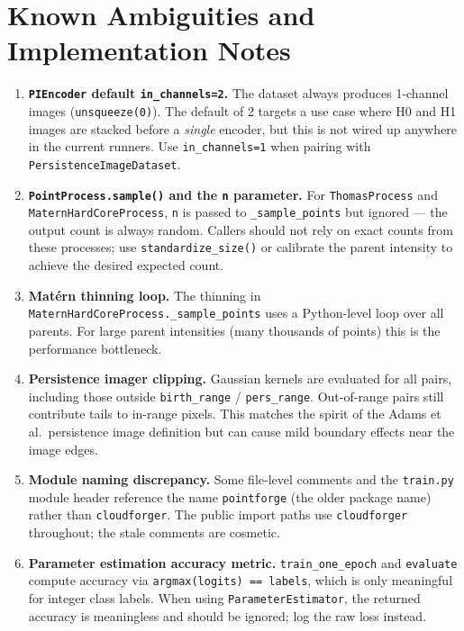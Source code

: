 \documentclass[11pt, a4paper]{article}
\newcommand{\code}[1]{\texttt{#1}}
\begin{document}
\section{Known Ambiguities and Implementation Notes}
\label{sec:ambiguities}

\begin{enumerate}

  \item \textbf{\code{PIEncoder} default \code{in\_channels=2}.}
        The dataset always produces 1-channel images
        (\code{unsqueeze(0)}).
        The default of 2 targets a use case where H0 and H1 images
        are stacked before a \emph{single} encoder, but this is not
        wired up anywhere in the current runners.
        Use \code{in\_channels=1} when pairing with
        \code{PersistenceImageDataset}.

  \item \textbf{\code{PointProcess.sample()} and the \code{n} parameter.}
        For \code{ThomasProcess} and \code{MaternHardCoreProcess},
        \code{n} is passed to \code{\_sample\_points} but ignored ---
        the output count is always random.
        Callers should not rely on exact counts from these processes;
        use \code{standardize\_size()} or calibrate the parent intensity
        to achieve the desired expected count.

  \item \textbf{Matérn thinning loop.}
        The thinning in \code{MaternHardCoreProcess.\_sample\_points}
        uses a Python-level loop over all parents.
        For large parent intensities (many thousands of points) this
        is the performance bottleneck.

  \item \textbf{Persistence imager clipping.}
        Gaussian kernels are evaluated for all pairs, including those
        outside \code{birth\_range} / \code{pers\_range}.
        Out-of-range pairs still contribute tails to in-range pixels.
        This matches the spirit of the Adams et al.\ persistence image
        definition but can cause mild boundary effects near the image
        edges.

  \item \textbf{Module naming discrepancy.}
        Some file-level comments and the \code{train.py} module header
        reference the name \code{pointforge} (the older package name)
        rather than \code{cloudforger}.
        The public import paths use \code{cloudforger} throughout;
        the stale comments are cosmetic.

  \item \textbf{Parameter estimation accuracy metric.}
        \code{train\_one\_epoch} and \code{evaluate} compute accuracy
        via \code{argmax(logits) == labels}, which is only meaningful
        for integer class labels.
        When using \code{ParameterEstimator}, the returned accuracy
        is meaningless and should be ignored; log the raw loss instead.

\end{enumerate}
\end{document}

